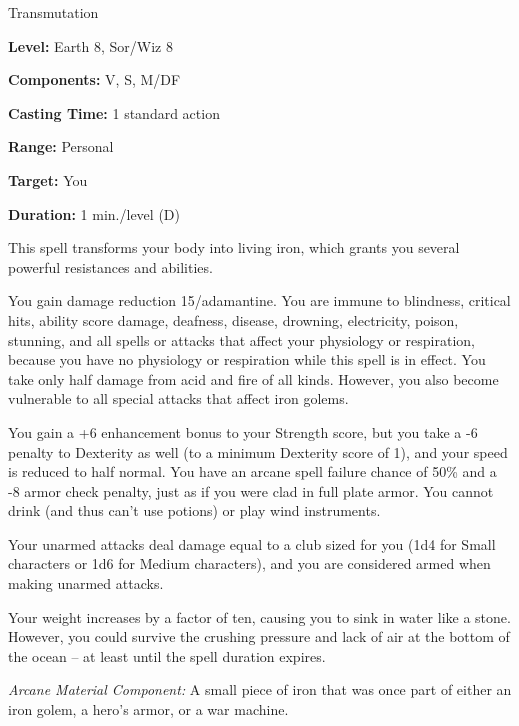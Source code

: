 
Transmutation

\textbf{Level:} Earth 8, Sor/Wiz 8

\textbf{Components:} V, S, M/DF

\textbf{Casting Time:} 1 standard action

\textbf{Range:} Personal

\textbf{Target:} You

\textbf{Duration:} 1 min./level (D)

This spell transforms your body into living iron, which grants you several powerful 
resistances and abilities.

You gain damage reduction 15/adamantine. You are immune to blindness, critical 
hits, ability score damage, deafness, disease, drowning, electricity, poison, stunning, 
and all spells or attacks that affect your physiology or respiration, because you 
have no physiology or respiration while this spell is in effect. You take only 
half damage from acid and fire of all kinds. However, you also become vulnerable 
to all special attacks that affect iron golems.

You gain a +6 enhancement bonus to your Strength score, but you take a -6 penalty 
to Dexterity as well (to a minimum Dexterity score of 1), and your speed is reduced 
to half normal. You have an arcane spell failure chance of 50\% and a -8 armor 
check penalty, just as if you were clad in full plate armor. You cannot drink (and 
thus can't use potions) or play wind instruments.

Your unarmed attacks deal damage equal to a club sized for you (1d4 for Small characters 
or 1d6 for Medium characters), and you are considered armed when making unarmed 
attacks.

Your weight increases by a factor of ten, causing you to sink in water like a stone. 
However, you could survive the crushing pressure and lack of air at the bottom 
of the ocean -- at least until the spell duration expires.

\textit{Arcane Material Component:} A small piece of iron that was once part of 
either an iron golem, a hero's armor, or a war machine.

